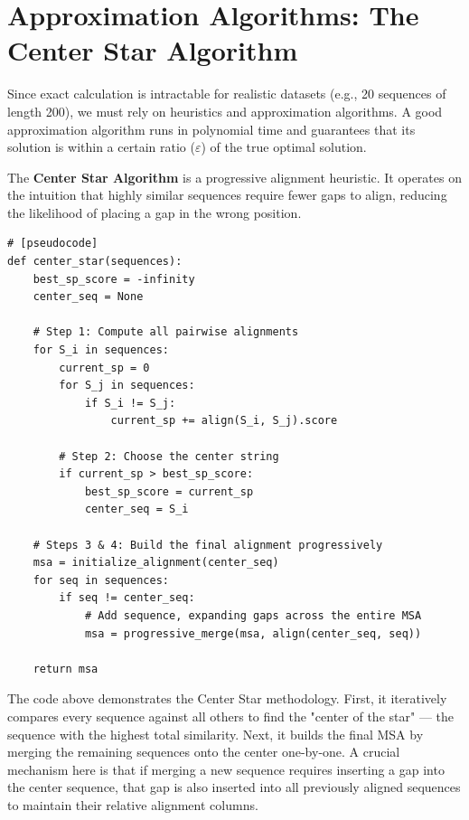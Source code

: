 \documentclass[11pt, a4paper]{article}
\begin{document}
\section{Approximation Algorithms: The Center Star Algorithm}

Since exact calculation is intractable for realistic datasets (e.g., 20 sequences of length 200), we must rely on heuristics and approximation algorithms. A good approximation algorithm runs in polynomial time and guarantees that its solution is within a certain ratio ($\varepsilon$) of the true optimal solution.

The \textbf{Center Star Algorithm} is a progressive alignment heuristic. It operates on the intuition that highly similar sequences require fewer gaps to align, reducing the likelihood of placing a gap in the wrong position.

\begin{verbatim}
# [pseudocode]
def center_star(sequences):
    best_sp_score = -infinity
    center_seq = None
    
    # Step 1: Compute all pairwise alignments
    for S_i in sequences:
        current_sp = 0
        for S_j in sequences:
            if S_i != S_j:
                current_sp += align(S_i, S_j).score
                
        # Step 2: Choose the center string
        if current_sp > best_sp_score:
            best_sp_score = current_sp
            center_seq = S_i

    # Steps 3 & 4: Build the final alignment progressively
    msa = initialize_alignment(center_seq)
    for seq in sequences:
        if seq != center_seq:
            # Add sequence, expanding gaps across the entire MSA
            msa = progressive_merge(msa, align(center_seq, seq)) 

    return msa
\end{verbatim}

The code above demonstrates the Center Star methodology. First, it iteratively compares every sequence against all others to find the "center of the star" — the sequence with the highest total similarity. Next, it builds the final MSA by merging the remaining sequences onto the center one-by-one. A crucial mechanism here is that if merging a new sequence requires inserting a gap into the center sequence, that gap is also inserted into all previously aligned sequences to maintain their relative alignment columns.
\end{document}
